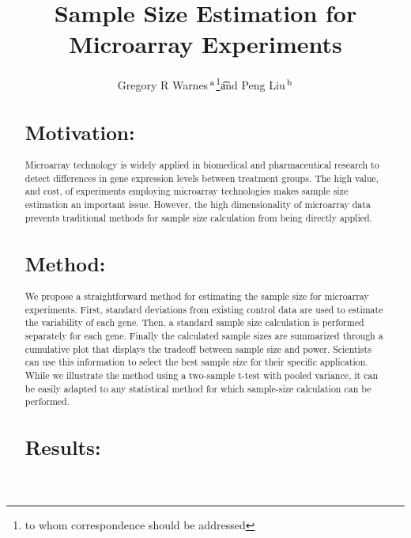 \documentclass{bioinfo}
\begin{document}

\title{Sample Size Estimation for Microarray Experiments}
\author{
  Gregory R Warnes\,$^{\rm a}$\footnote{to whom correspondence should
    be addressed}\t
  and
  Peng Liu\,$^{\rm b}$
}
\address{
  $^{\rm a}$Nonclinical Statistics, Pfizer Global Research and Development,
  Groton, CT 06340 \\
  $^{\rm b}$Department of Biological Statistics and Computational
  Biology, Cornell University, Ithaca, NY 14853
  }

\maketitle

\begin{abstract}

\section{Motivation:}

Microarray technology is widely applied in biomedical and
pharmaceutical research to detect differences in gene expression
levels between treatment groups.  The high value, and cost, of
experiments employing microarray technologies makes sample size
estimation an important issue.  However, the high dimensionality of
microarray data prevents traditional methods for sample size
calculation from being directly applied.

\section{Method:}

We propose a straightforward method for estimating the sample size
for microarray experiments. First, standard deviations from
existing control data are used to estimate the variability of each
gene. Then, a standard sample size calculation is performed
separately for each gene.  Finally the calculated sample sizes are
summarized through a cumulative plot that displays the tradeoff
between sample size and power.  Scientists can use this
information to select the best sample size for their specific
application.  While we illustrate the method using a two-sample
t-test with pooled variance, it can be easily adapted to any
statistical method for which sample-size calculation can be
performed.

\section{Results:}


\end{abstract}
\end{document}
